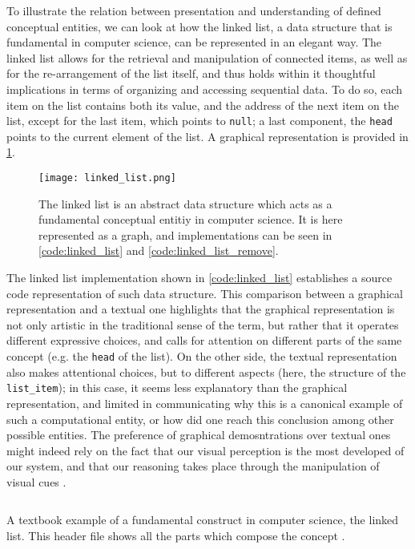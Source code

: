 To illustrate the relation between presentation and understanding of defined conceptual entities, we can look at how the linked list, a data structure that is fundamental in computer science, can be represented in an elegant way. The linked list allows for the retrieval and manipulation of connected items, as well as for the re-arrangement of the list itself, and thus holds within it thoughtful implications in terms of organizing and accessing sequential data. To do so, each item on the list contains both its value, and the address of the next item on the list, except for the last item, which points to \lstinline{null}; a last component, the \lstinline{head} points to the current element of the list. A graphical representation is provided in \ref{graphic:linked-list}.

\begin{figure}
    \texttt{[image: linked\_list.png]}
    \caption{The linked list is an abstract data structure which acts as a fundamental conceptual entitiy in computer science. It is here represented as a graph, and implementations can be seen in \ref{code:linked_list} and \ref{code:linked_list_remove}.}
    \label{graphic:linked-list}
\end{figure}

The linked list implementation shown in \ref{code:linked_list} establishes a source code representation of such data structure. This comparison between a graphical representation and a textual one highlights that the graphical representation is not only artistic in the traditional sense of the term, but rather that it  operates different expressive choices, and calls for attention on different parts of the same concept (e.g. the \lstinline{head} of the list). On the other side, the textual representation also makes attentional choices, but to different aspects (here, the structure of the \lstinline{list_item}); in this case, it seems less explanatory than the graphical representation, and limited in communicating why this is a canonical example of such a computational entity, or how did one reach this conclusion among other possible entities. The preference of graphical demosntrations over textual ones might indeed rely on the fact that our visual perception is the most developed of our system, and that our reasoning takes place through the manipulation of visual cues \citep{wallen_form_1990}.

\begin{listing}
    \inputminted{c}{./corpus/linked_list.h}
    \caption{A textbook example of a fundamental construct in computer science, the linked list. This header file shows all the parts which compose the concept \citep{kirchner_linked_2022}.}
    \label{code:linked_list}
\end{listing}

